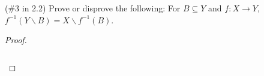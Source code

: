 (\#3 in 2.2) Prove or disprove the following:
For $B\subseteq Y$ and $f:X\to Y$, $f^{-1}(Y\backslash B)=X\backslash f^{-1}(B)$. 

    \begin{proof}\renewcommand{\qedsymbol}{}\ \\\\
        \begin{align*}
        \end{align*}
    \end{proof}